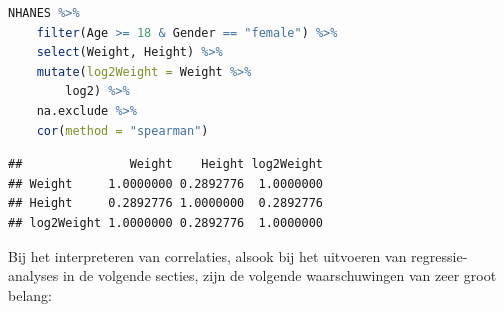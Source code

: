 \documentclass[
  12pt,dutch,coursenotes]{book}
\begin{document}
\begin{lstlisting}[language=R]
NHANES %>%
    filter(Age >= 18 & Gender == "female") %>%
    select(Weight, Height) %>%
    mutate(log2Weight = Weight %>%
        log2) %>%
    na.exclude %>%
    cor(method = "spearman")
\end{lstlisting}

\begin{lstlisting}
##               Weight    Height log2Weight
## Weight     1.0000000 0.2892776  1.0000000
## Height     0.2892776 1.0000000  0.2892776
## log2Weight 1.0000000 0.2892776  1.0000000
\end{lstlisting}

Bij het interpreteren van correlaties, alsook bij het uitvoeren van
regressie-analyses in de volgende secties, zijn de volgende waarschuwingen
van zeer groot belang:
\end{document}
